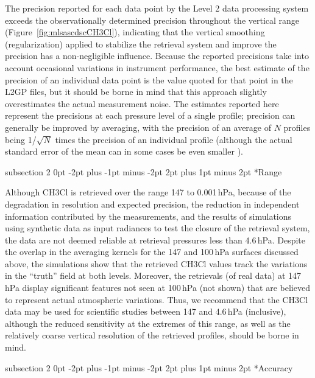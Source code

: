 \documentclass[11pt,draft]{report}
\makeatletter
\renewcommand{\subsection}{\@startsection%
  {subsection}%
  {2}%
  {0pt}%
  {-2pt plus -1pt minus -2pt}%
  {2pt plus 1pt minus 2pt}%
  {\large\sffamily\fontseries{sb}\selectfont\flushleft\color{SectionColor}\figureversion{tabular}}}%
\makeatother
\begin{document}
The precision reported for each data point by the Level 2 data
processing system exceeds the observationally determined precision
throughout the vertical range (Figure~\ref{fig:mlsascdscCH3Cl}),
indicating that the vertical smoothing (regularization) applied to
stabilize the retrieval system and improve the precision has a
non-negligible influence. Because the reported precisions take into
account occasional variations in instrument performance, the best
estimate of the precision of an individual data point is the value
quoted for that point in the L2GP files, but it should be borne in
mind that this approach slightly overestimates the actual measurement
noise. The estimates reported here represent the precisions at each
pressure level of a single profile; precision can generally be
improved by averaging, with the precision of an average of $N$
profiles being 1/$\sqrt{N}$ times the precision of an individual
profile (although the actual standard error of the mean can in some
cases be even smaller \citep{TooheyAndVonClarmann13}).

\subsection*{Range}

Although CH\cs3Cl is retrieved over the range 147 to 0.001\,hPa,
because of the degradation in resolution and expected precision, the
reduction in independent information contributed by the measurements,
and the results of simulations using synthetic data as input radiances
to test the closure of the retrieval system, the data are not deemed
reliable at retrieval pressures less than 4.6\,hPa. Despite the
overlap in the averaging kernels for the 147 and 100\,hPa surfaces
discussed above, the simulations show that the retrieved CH\cs3Cl
values track the variations in the ``truth'' field at both levels.
Moreover, the retrievals (of real data) at 147\,hPa display
significant features not seen at 100\,hPa (not shown) that are
believed to represent actual atmospheric variations. Thus, we
recommend that the \thisv CH\cs3Cl data may be used for scientific
studies between 147 and 4.6\,hPa (inclusive), although the reduced
sensitivity at the extremes of this range, as well as the relatively
coarse vertical resolution of the retrieved profiles, should be borne
in mind.

\subsection*{Accuracy}
\end{document}
